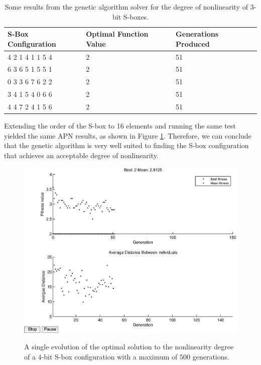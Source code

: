 \documentclass[11pt]{article}
\begin{document}
\begin{table}
	\centering
	\caption{Some results from the genetic algorithm solver for the degree of nonlinearity of $3$-bit S-boxes.}
	\label{nlTable}
    \begin{tabular}{|l|l|l|}
        \hline
        S-Box Configuration & Optimal Function Value & Generations Produced \\ \hline
        4     2     1     4     1     1     5     4 & 2 & 51 \\ 
        6     3     6     5     1     5     5     1 & 2 & 51 \\ 
        0     3     3     6     7     6     2     2 & 2 & 51 \\ 
        3     4     1     5     4     0     6     6 & 2 & 51 \\ 
        4     4     7     2     4     1     5     6 & 2 & 51 \\ 
        \hline
    \end{tabular}
\end{table}

Extending the order of the S-box to 16 elements and running the same test yielded the same APN results, as shown in Figure \ref{nl16}. Therefore, we can conclude that the genetic algorithm is very well suited to finding the S-box configuration that achieves an acceptable degree of nonlinearity.

\begin{figure}
	\centering
	\includegraphics[scale=0.5]{images/nl_results16.eps} \\
	\label{nl16}
\caption{A single evolution of the optimal solution to the nonlinearity degree of a $4$-bit S-box configuration with a maximum of $500$ generations.}
\end{figure}
\end{document}
